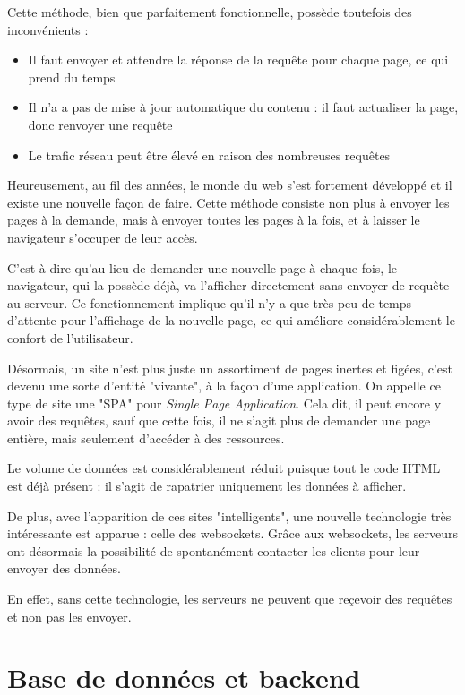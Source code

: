 \documentclass[
    iai, %
    eai, %
]{heig-tb}
\begin{document}
Cette méthode, bien que parfaitement fonctionnelle, possède toutefois des inconvénients :
\begin{itemize}
  \item Il faut envoyer et attendre la réponse de la requête pour chaque page, ce qui prend du temps
  \item Il n'a a pas de mise à jour automatique du contenu : il faut actualiser la page, donc renvoyer une requête
  \item Le trafic réseau peut être élevé en raison des nombreuses requêtes
\end{itemize}
\bigskip
Heureusement, au fil des années, le monde du web s'est fortement développé et il existe une nouvelle façon de faire.
Cette méthode consiste non plus à envoyer les pages à la demande, mais à envoyer toutes les pages à la fois, et à laisser le navigateur s'occuper de leur accès.

C'est à dire qu'au lieu de demander une nouvelle page à chaque fois, le navigateur, qui la possède déjà, va l'afficher directement sans envoyer de requête au serveur.
Ce fonctionnement implique qu'il n'y a que très peu de temps d'attente pour l'affichage de la nouvelle page, ce qui améliore considérablement le confort de l'utilisateur.


Désormais, un site n'est plus juste un assortiment de pages inertes et figées, c'est devenu une sorte d'entité "vivante", à la façon d'une application.
On appelle ce type de site une "SPA" pour \emph{Single Page Application}.
Cela dit, il peut encore y avoir des requêtes, sauf que cette fois, il ne s'agit plus de demander une page entière, mais seulement d'accéder à des ressources.

Le volume de données est considérablement réduit puisque tout le code HTML est déjà présent : il s'agit de rapatrier uniquement les données à afficher.

De plus, avec l'apparition de ces sites "intelligents", une nouvelle technologie très intéressante est apparue : celle des websockets.
Grâce aux websockets, les serveurs ont désormais la possibilité de spontanément contacter les clients pour leur envoyer des données.

En effet, sans cette technologie, les serveurs ne peuvent que reçevoir des requêtes et non pas les envoyer.

\section{Base de données et backend}
\end{document}
